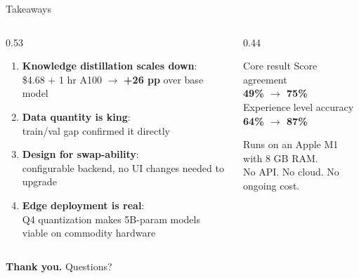\documentclass[aspectratio=169,11pt]{beamer}
\newcommand{\highlight}[1]{\textcolor{accentblue}{\textbf{#1}}}
\begin{document}
\begin{frame}{Takeaways}
\begin{columns}[T]
\begin{column}{0.53\textwidth}
  \begin{enumerate}
    \setlength\itemsep{0.5em}
    \item \textbf{Knowledge distillation scales down}:\\
          \$4.68 + 1 hr A100 $\to$ \highlight{+26 pp} over base model
    \item \textbf{Data quantity is king}:\\
          train/val gap confirmed it directly
    \item \textbf{Design for swap-ability}:\\
          configurable backend, no UI changes needed to upgrade
    \item \textbf{Edge deployment is real}:\\
          Q4 quantization makes 5B-param models viable on commodity hardware
  \end{enumerate}
\end{column}
\begin{column}{0.44\textwidth}
  \begin{block}{Core result}
    \centering
    {\small Score agreement}\\[0.2em]
    \highlight{\large 49\% $\to$ 75\%}\\[0.4em]
    {\small Experience level accuracy}\\[0.2em]
    \highlight{\large 64\% $\to$ 87\%}\\[0.3em]
  \end{block}
  \small
  Runs on an Apple M1 with 8 GB RAM.\\
  No API. No cloud. No ongoing cost.
\end{column}
\end{columns}
\vspace{0.3em}
\begin{center}
  \large \textbf{Thank you.} \quad Questions?
\end{center}
\end{frame}
\end{document}

